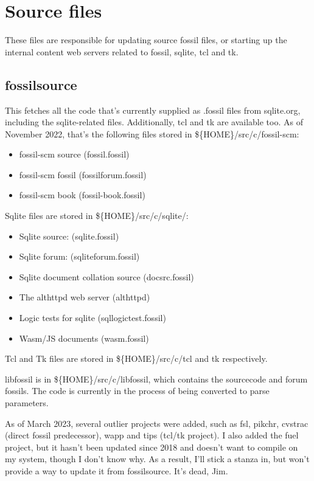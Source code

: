 \documentclass[11pt]{article}
\begin{document}
\setcounter{tocdepth}{2}
\tableofcontents

\newpage

\section*{Source files}
\label{sec:orgbd24135}

These files are responsible for updating source fossil files, or starting up the internal
content web servers related to fossil, sqlite, tcl and tk.

\subsection*{fossilsource}
\label{sec:org8c91ce1}

This fetches all the code that's currently supplied as .fossil files from sqlite.org, including
the sqlite-related files. Additionally, tcl and tk are available too.
As of November 2022, that's the following files stored in \$\{HOME\}/src/c/fossil-scm:
\begin{itemize}
\item fossil-scm source (fossil.fossil)
\item fossil-scm fossil (fossilforum.fossil)
\item fossil-scm book (fossil-book.fossil)
\end{itemize}

Sqlite files are stored in \$\{HOME\}/src/c/sqlite/:
\begin{itemize}
\item Sqlite source: (sqlite.fossil)
\item Sqlite forum: (sqliteforum.fossil)
\item Sqlite document collation source (docsrc.fossil)
\item The althttpd web server (althttpd)
\item Logic tests for sqlite (sqllogictest.fossil)
\item Wasm/JS documents (wasm.fossil)
\end{itemize}

Tcl and Tk files are stored in \$\{HOME\}/src/c/tcl and tk respectively.

libfossil is in \$\{HOME\}/src/c/libfossil, which contains the sourcecode and forum fossils.
The code is currently in the process of being converted to parse parameters.

As of March 2023, several outlier projects were added, such as fsl, pikchr, cvstrac (direct fossil
predecessor), wapp and tips (tcl/tk project). I also added the fuel project, but it hasn't been
updated since 2018 and doesn't want to compile on my system, though I don't know why. As a
result, I'll stick a stanza in, but won't provide a way to update it from fossilsource. It's dead, Jim.
\end{document}
